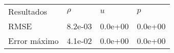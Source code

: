 \begin{tabular}{llll}
Resultados & $\rho$ & $u$ & $p$ \\
RMSE & 8.2e-03 & 0.0e+00 & 0.0e+00 \\
Error máximo & 4.1e-02 & 0.0e+00 & 0.0e+00 \\
\end{tabular}
